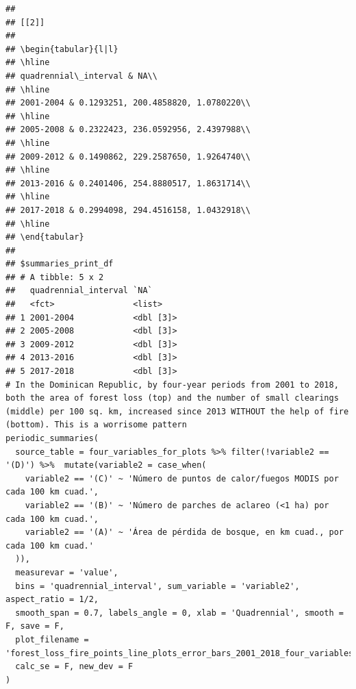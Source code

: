 \documentclass[10pt,landscape,a3paper]{article}
\begin{document}
\begin{verbatim}
## 
## [[2]]
## 
## \begin{tabular}{l|l}
## \hline
## quadrennial\_interval & NA\\
## \hline
## 2001-2004 & 0.1293251, 200.4858820, 1.0780220\\
## \hline
## 2005-2008 & 0.2322423, 236.0592956, 2.4397988\\
## \hline
## 2009-2012 & 0.1490862, 229.2587650, 1.9264740\\
## \hline
## 2013-2016 & 0.2401406, 254.8880517, 1.8631714\\
## \hline
## 2017-2018 & 0.2994098, 294.4516158, 1.0432918\\
## \hline
## \end{tabular}
## 
## $summaries_print_df
## # A tibble: 5 x 2
##   quadrennial_interval `NA`     
##   <fct>                <list>   
## 1 2001-2004            <dbl [3]>
## 2 2005-2008            <dbl [3]>
## 3 2009-2012            <dbl [3]>
## 4 2013-2016            <dbl [3]>
## 5 2017-2018            <dbl [3]>
# In the Dominican Republic, by four-year periods from 2001 to 2018, both the area of forest loss (top) and the number of small clearings (middle) per 100 sq. km, increased since 2013 WITHOUT the help of fire (bottom). This is a worrisome pattern
periodic_summaries(
  source_table = four_variables_for_plots %>% filter(!variable2 == '(D)') %>%  mutate(variable2 = case_when(
    variable2 == '(C)' ~ 'Número de puntos de calor/fuegos MODIS por cada 100 km cuad.',
    variable2 == '(B)' ~ 'Número de parches de aclareo (<1 ha) por cada 100 km cuad.',
    variable2 == '(A)' ~ 'Área de pérdida de bosque, en km cuad., por cada 100 km cuad.'
  )),
  measurevar = 'value',
  bins = 'quadrennial_interval', sum_variable = 'variable2', aspect_ratio = 1/2,
  smooth_span = 0.7, labels_angle = 0, xlab = 'Quadrennial', smooth = F, save = F,
  plot_filename = 'forest_loss_fire_points_line_plots_error_bars_2001_2018_four_variables_quadrennial.jpg',
  calc_se = F, new_dev = F
)
\end{verbatim}
\end{document}

